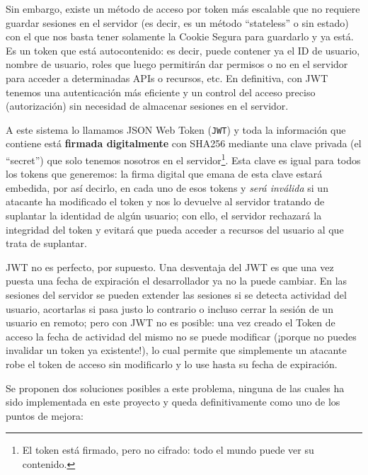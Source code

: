 \documentclass[a4paper,12pt]{report}
\begin{document}
				Sin embargo, existe un método de acceso por token más escalable que no requiere guardar sesiones en el servidor (es decir, es un método ``stateless'' o sin estado) con el que nos basta tener solamente la Cookie Segura para guardarlo y ya está. Es un token que está autocontenido: es decir, puede contener ya el ID de usuario, nombre de usuario, roles que luego permitirán dar permisos o no en el servidor para acceder a determinadas APIs o recursos, etc. En definitiva, con JWT tenemos una autenticación más eficiente y un control del acceso preciso (autorización) sin necesidad de almacenar sesiones en el servidor.
				
				
				A este sistema lo llamamos JSON Web Token (\texttt{JWT}) y toda la información que contiene está \textbf{firmada digitalmente} con SHA256 mediante una clave privada (el ``secret'') que solo tenemos nosotros en el servidor\footnote{El token está firmado, pero no cifrado: todo el mundo puede ver su contenido.}. Esta clave es igual para todos los tokens que generemos: la firma digital que emana de esta clave estará embedida, por así decirlo, en cada uno de esos tokens y \textit{será inválida} si un atacante ha modificado el token y nos lo devuelve al servidor tratando de suplantar la identidad de algún usuario; con ello, el servidor rechazará la integridad del token y evitará que pueda acceder a recursos del usuario al que trata de suplantar.
				
				JWT no es perfecto, por supuesto. Una desventaja del JWT es que una vez puesta una fecha de expiración el desarrollador ya no la puede cambiar. En las sesiones del servidor se pueden extender las sesiones si se detecta actividad del usuario, acortarlas si pasa justo lo contrario o incluso cerrar la sesión de un usuario en remoto; pero con JWT no es posible: una vez creado el Token de acceso la fecha de actividad del mismo no se puede modificar (¡porque no puedes invalidar un token ya existente!), lo cual permite que simplemente un atacante robe el token de acceso sin modificarlo y lo use hasta su fecha de expiración.
				
				Se proponen dos soluciones posibles a este problema, ninguna de las cuales ha sido implementada en este proyecto y queda definitivamente como uno de los puntos de mejora:
				
\end{document}
